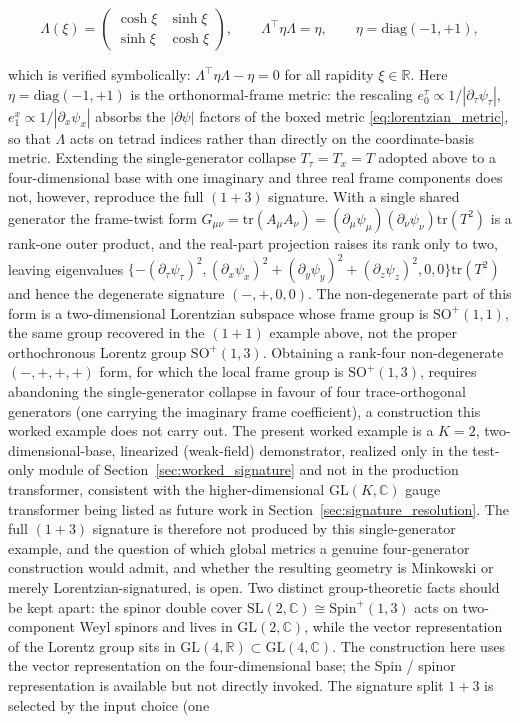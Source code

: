 \documentclass[11pt]{article}
\begin{document}
\begin{equation}
\Lambda(\xi) = \begin{pmatrix} \cosh\xi & \sinh\xi \\ \sinh\xi & \cosh\xi \end{pmatrix}, \qquad \Lambda^\top \eta\Lambda = \eta, \qquad \eta = \mathrm{diag}(-1, +1),
\end{equation}

which is verified symbolically: $\Lambda^\top \eta\Lambda - \eta = 0$ for all rapidity $\xi \in \mathbb{R}$. Here $\eta = \mathrm{diag}(-1, +1)$ is the orthonormal-frame metric: the rescaling $e_0^\tau \propto 1/|\partial_\tau\psi_\tau|$, $e_1^x \propto 1/|\partial_x\psi_x|$ absorbs the $|\partial\psi|$ factors of the boxed metric \eqref{eq:lorentzian_metric}, so that $\Lambda$ acts on tetrad indices rather than directly on the coordinate-basis metric. Extending the single-generator collapse $T_\tau = T_x = T$ adopted above to a four-dimensional base with one imaginary and three real frame components does not, however, reproduce the full $(1{+}3)$ signature. With a single shared generator the frame-twist form $G_{\mu\nu} = \mathrm{tr}(A_\mu A_\nu) = (\partial_\mu \psi_\mu)(\partial_\nu \psi_\nu)\mathrm{tr}(T^2)$ is a rank-one outer product, and the real-part projection raises its rank only to two, leaving eigenvalues $\{-(\partial_\tau\psi_\tau)^2, (\partial_x\psi_x)^2 + (\partial_y\psi_y)^2 + (\partial_z\psi_z)^2, 0, 0\}\mathrm{tr}(T^2)$ and hence the degenerate signature $(-,+,0,0)$. The non-degenerate part of this form is a two-dimensional Lorentzian subspace whose frame group is $\mathrm{SO}^+(1,1)$, the same group recovered in the $(1{+}1)$ example above, not the proper orthochronous Lorentz group $\mathrm{SO}^+(1,3)$. Obtaining a rank-four non-degenerate $(-,+,+,+)$ form, for which the local frame group is $\mathrm{SO}^+(1,3)$, requires abandoning the single-generator collapse in favour of four trace-orthogonal generators (one carrying the imaginary frame coefficient), a construction this worked example does not carry out. The present worked example is a $K=2$, two-dimensional-base, linearized (weak-field) demonstrator, realized only in the test-only module of Section~\ref{sec:worked_signature} and not in the production transformer, consistent with the higher-dimensional $\mathrm{GL}(K,\mathbb{C})$ gauge transformer being listed as future work in Section~\ref{sec:signature_resolution}. The full $(1{+}3)$ signature is therefore not produced by this single-generator example, and the question of which global metrics a genuine four-generator construction would admit, and whether the resulting geometry is Minkowski or merely Lorentzian-signatured, is open. Two distinct group-theoretic facts should be kept apart: the spinor double cover $\mathrm{SL}(2,\mathbb{C}) \cong \mathrm{Spin}^+(1,3)$ acts on two-component Weyl spinors and lives in $\mathrm{GL}(2,\mathbb{C})$, while the vector representation of the Lorentz group sits in $\mathrm{GL}(4,\mathbb{R}) \subset \mathrm{GL}(4,\mathbb{C})$. The construction here uses the vector representation on the four-dimensional base; the Spin / spinor representation is available but not directly invoked. The signature split $1{+}3$ is selected by the input choice (one 
\end{document}
